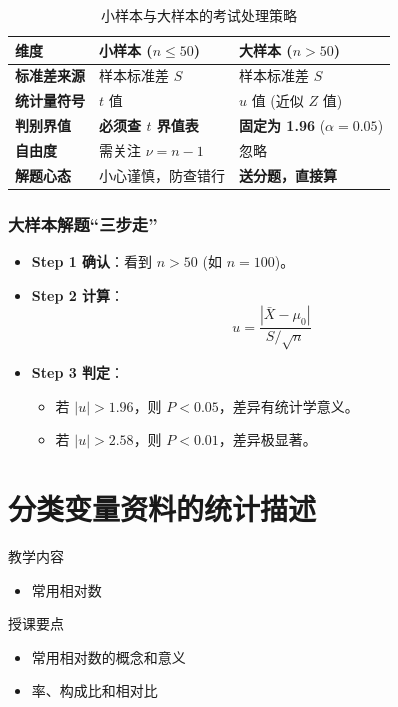 \documentclass[lang=cn,10pt]{elegantbook}
\begin{document}
\begin{table}[htbp]
    \centering
    \caption{小样本与大样本的考试处理策略}
    \begin{tabular}{lp{5cm}p{5cm}}
        \toprule
        \textbf{维度} & \textbf{小样本 ($n \le 50$)} & \textbf{大样本 ($n > 50$)} \\
        \midrule
        \textbf{标准差来源} & 样本标准差 $S$ & 样本标准差 $S$ \\
        \textbf{统计量符号} & $t$ 值 & $u$ 值 (近似 $Z$ 值) \\
        \textbf{判别界值} & \textbf{必须查 $t$ 界值表} & \textbf{固定为 1.96} ($\alpha=0.05$) \\
        \textbf{自由度} & 需关注 $\nu = n-1$ & 忽略 \\
        \textbf{解题心态} & 小心谨慎，防查错行 & \textbf{送分题，直接算} \\
        \bottomrule
    \end{tabular}
\end{table}

\subsection{大样本解题“三步走”}
\begin{itemize}
    \item \textbf{Step 1 确认}：看到 $n > 50$ (如 $n=100$)。
    \item \textbf{Step 2 计算}：
    \[ u = \frac{|\bar{X} - \mu_0|}{S/\sqrt{n}} \]
    \item \textbf{Step 3 判定}：
    \begin{itemize}
        \item 若 $|u| > 1.96$，则 $P < 0.05$，差异有统计学意义。
        \item 若 $|u| > 2.58$，则 $P < 0.01$，差异极显著。
    \end{itemize}
\end{itemize}




\chapter{分类变量资料的统计描述}

\begin{introduction}
    \item 教学内容
    \begin{itemize}
        \item 常用相对数
    \end{itemize}
    \item 授课要点
    \begin{itemize}
        \item 常用相对数的概念和意义
        \item 率、构成比和相对比

    \end{itemize}
\end{introduction}
\end{document}
